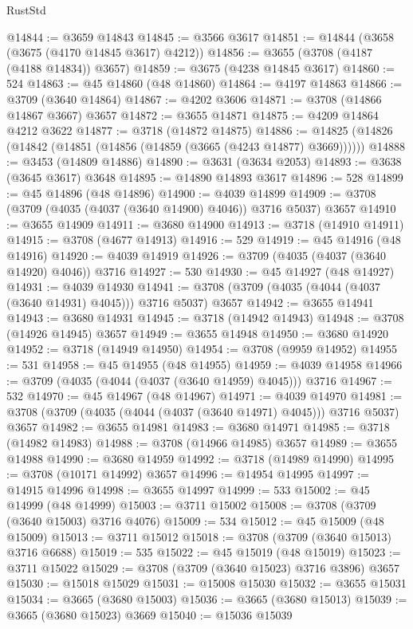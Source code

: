 \begin{lexlean}{RustStd}
\begin{coremodule}
@14844 := @3659 @14843
@14845 := @3566 @3617
@14851 := @14844 (@3658 (@3675 (@4170 @14845 @3617) @4212))
@14856 := @3655 (@3708 (@4187 (@4188 @14834)) @3657)
@14859 := @3675 (@4238 @14845 @3617)
@14860 := 524
@14863 := @45 @14860 (@48 @14860)
@14864 := @4197 @14863
@14866 := @3709 (@3640 @14864)
@14867 := @4202 @3606
@14871 := @3708 (@14866 @14867 @3667) @3657
@14872 := @3655 @14871
@14875 := @4209 @14864 @4212 @3622
@14877 := @3718 (@14872 @14875)
@14886 := @14825 (@14826 (@14842 (@14851 (@14856 (@14859 (@3665 (@4243 @14877) @3669))))))
@14888 := @3453 (@14809 @14886)
@14890 := @3631 (@3634 @2053)
@14893 := @3638 (@3645 @3617) @3648
@14895 := @14890 @14893 @3617
@14896 := 528
@14899 := @45 @14896 (@48 @14896)
@14900 := @4039 @14899
@14909 := @3708 (@3709 (@4035 (@4037 (@3640 @14900) @4046)) @3716 @5037) @3657
@14910 := @3655 @14909
@14911 := @3680 @14900
@14913 := @3718 (@14910 @14911)
@14915 := @3708 (@4677 @14913)
@14916 := 529
@14919 := @45 @14916 (@48 @14916)
@14920 := @4039 @14919
@14926 := @3709 (@4035 (@4037 (@3640 @14920) @4046)) @3716
@14927 := 530
@14930 := @45 @14927 (@48 @14927)
@14931 := @4039 @14930
@14941 := @3708 (@3709 (@4035 (@4044 (@4037 (@3640 @14931) @4045))) @3716 @5037) @3657
@14942 := @3655 @14941
@14943 := @3680 @14931
@14945 := @3718 (@14942 @14943)
@14948 := @3708 (@14926 @14945) @3657
@14949 := @3655 @14948
@14950 := @3680 @14920
@14952 := @3718 (@14949 @14950)
@14954 := @3708 (@9959 @14952)
@14955 := 531
@14958 := @45 @14955 (@48 @14955)
@14959 := @4039 @14958
@14966 := @3709 (@4035 (@4044 (@4037 (@3640 @14959) @4045))) @3716
@14967 := 532
@14970 := @45 @14967 (@48 @14967)
@14971 := @4039 @14970
@14981 := @3708 (@3709 (@4035 (@4044 (@4037 (@3640 @14971) @4045))) @3716 @5037) @3657
@14982 := @3655 @14981
@14983 := @3680 @14971
@14985 := @3718 (@14982 @14983)
@14988 := @3708 (@14966 @14985) @3657
@14989 := @3655 @14988
@14990 := @3680 @14959
@14992 := @3718 (@14989 @14990)
@14995 := @3708 (@10171 @14992) @3657
@14996 := @14954 @14995
@14997 := @14915 @14996
@14998 := @3655 @14997
@14999 := 533
@15002 := @45 @14999 (@48 @14999)
@15003 := @3711 @15002
@15008 := @3708 (@3709 (@3640 @15003) @3716 @4076)
@15009 := 534
@15012 := @45 @15009 (@48 @15009)
@15013 := @3711 @15012
@15018 := @3708 (@3709 (@3640 @15013) @3716 @6688)
@15019 := 535
@15022 := @45 @15019 (@48 @15019)
@15023 := @3711 @15022
@15029 := @3708 (@3709 (@3640 @15023) @3716 @3896) @3657
@15030 := @15018 @15029
@15031 := @15008 @15030
@15032 := @3655 @15031
@15034 := @3665 (@3680 @15003)
@15036 := @3665 (@3680 @15013)
@15039 := @3665 (@3680 @15023) @3669
@15040 := @15036 @15039

\end{coremodule}
\end{lexlean}
